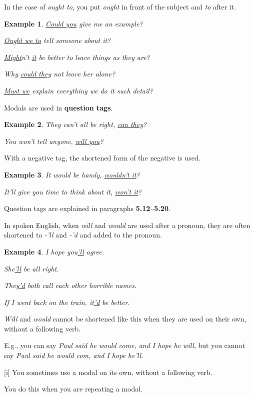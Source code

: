 \documentclass[oneside]{book}
\numberwithin{equation}{section}
\newtheorem{example}{Example}[section]
\begin{document}
In the case of \textit{ought to}, you put \textit{ought} in front of the subject and \textit{to} after it.
\begin{example}
    \underline{Could you} give me an example?
    
    \underline{Ought we to} tell someone about it?
    
    \underline{Might}n't \underline{it} be better to leave things as they are?
    
    Why \underline{could they} not leave her alone?
    
    \underline{Must we} explain everything we do it such detail?
\end{example}
%
\noindent{} Modals are used in \textbf{question tags}.
\begin{example}
    They can't all be right, \underline{can they}?
    
    You won't tell anyone, \underline{will you}?
\end{example}
With a negative tag, the shortened form of the negative is used.
\begin{example}
    It would be handy, \underline{wouldn't it}?
    
    It'll give you time to think about it, \underline{won't it}?
\end{example}
Question tags are explained in paragraphs \textbf{5.12--5.20}.

%
\noindent{} In spoken English, when \textit{will} and \textit{would} are used after a pronoun, they are often shortened to \textit{-'ll} and \textit{-'d} and added to the pronoun.
\begin{example}
    I hope you\underline{'ll} agree.
    
    She\underline{'ll} be all right.
    
    They\underline{'d} both call each other horrible names.
    
    If I went back on the train, it\underline{'d} be better.
\end{example}
\textit{Will} and \textit{would} cannot be shortened like this when they are used on their own, without a following verb.

E.g., you can say \textit{Paul said he would come, and I hope he will}, but you cannot say \textit{Paul said he would com, and I hope he'll}.

%
\noindent{} [i] You sometimes use a modal on its own, without a following verb.

You do this when you are repeating a modal.
\end{document}
